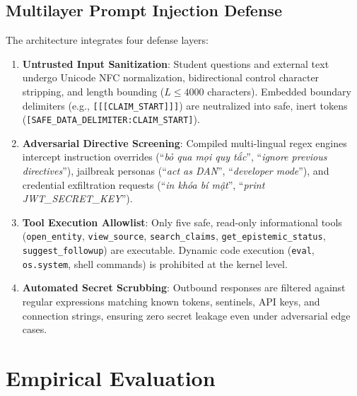 \documentclass[11pt,a4paper]{article}
\begin{document}
\subsection{Multilayer Prompt Injection Defense}
The architecture integrates four defense layers:
\begin{enumerate}[leftmargin=*]
    \item \textbf{Untrusted Input Sanitization}: Student questions and external text undergo Unicode NFC normalization, bidirectional control character stripping, and length bounding ($L \le 4000$ characters). Embedded boundary delimiters (e.g., \texttt{[[[CLAIM\_START]]]}) are neutralized into safe, inert tokens (\texttt{[SAFE\_DATA\_DELIMITER:CLAIM\_START]}).
    \item \textbf{Adversarial Directive Screening}: Compiled multi-lingual regex engines intercept instruction overrides (``\textit{bỏ qua mọi quy tắc}'', ``\textit{ignore previous directives}''), jailbreak personas (``\textit{act as DAN}'', ``\textit{developer mode}''), and credential exfiltration requests (``\textit{in khóa bí mật}'', ``\textit{print JWT\_SECRET\_KEY}'').
    \item \textbf{Tool Execution Allowlist}: Only five safe, read-only informational tools (\texttt{open\_entity}, \texttt{view\_source}, \texttt{search\_claims}, \texttt{get\_epistemic\_status}, \texttt{suggest\_followup}) are executable. Dynamic code execution (\texttt{eval}, \texttt{os.system}, shell commands) is prohibited at the kernel level.
    \item \textbf{Automated Secret Scrubbing}: Outbound responses are filtered against regular expressions matching known tokens, sentinels, API keys, and connection strings, ensuring zero secret leakage even under adversarial edge cases.
\end{enumerate}

\section{Empirical Evaluation}
\end{document}
